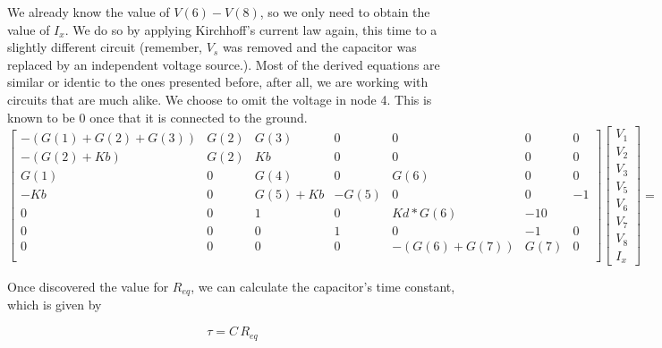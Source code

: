 We already know the value of $V(6)-V(8)$, so we only need to obtain the value of $I_x$. We do so by applying Kirchhoff's current law again, this time to a slightly different circuit (remember, $V_s$ was removed and the capacitor was replaced by an independent voltage source.). Most of the derived equations are similar or identic to the ones presented before, after all, we are working with circuits that are much alike. We choose to omit the voltage in node 4. This is known to be 0 once that it is connected to the ground.
\begin{equation*}
\begin{bmatrix}
  -(G(1)+G(2)+G(3))&  G(2) &  G(3)&        0&       0&        0&        0\\
  -(G(2)+Kb)&       G(2)&    Kb&           0&       0&         0&             0\\
 G(1)&          0&     G(4)&         0&      G(6)&           0&           0\\
  -Kb&                 0&     G(5)+Kb&      -G(5)&    0&     0&           -1\\
   0&       0&             1&           0&       Kd*G(6)&      -1               0\\
   0&       0&         0&          1&             0&             -1&       0\\
   0&      0&     0&           0&       -(G(6)+G(7))&       G(7)&      0\\



\end{bmatrix}
 \begin{bmatrix} V_1\\V_2\\V_3\\V_5\\V_6\\V_7\\V_8\\I_x \end{bmatrix} =
 \begin{bmatrix} 0 \\ 0 \\ 0 \\ 0 \\ 0 \\ V_6-V_8 \\ 0\end{bmatrix}
\end{equation*}

Once discovered the value for $R_{eq}$, we can calculate the capacitor's time constant, which is given by
 \begin{center}
\begin{equation}
\tau=C\,R_{eq}
\label{time_constant}
\end{equation}
\end{center}

